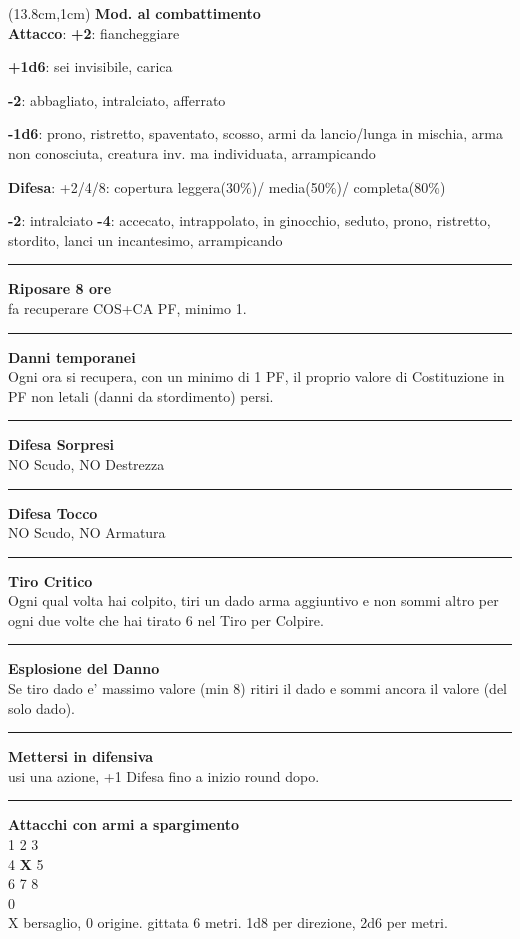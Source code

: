 \documentclass[a4paper,12 pt,openany]{book}
\newcommand{\riga}{\rule{\textwidth}{0.4pt}}
\begin{document}
\begin{textblock*}{6.2cm}(13.8cm,1cm) %
\textbf{Mod. al combattimento}\\
\textbf{Attacco}:
\textbf{+2}: fiancheggiare

\textbf{+1d6}: sei invisibile, carica

\textbf{-2}: abbagliato, intralciato, afferrato

\textbf{-1d6}: prono, ristretto, spaventato, scosso, armi da lancio/lunga in mischia, arma non conosciuta, creatura inv. ma individuata, arrampicando

\textbf{Difesa}: +2/4/8: copertura leggera(30\%)/ media(50\%)/ completa(80\%)

\textbf{-2}: intralciato \textbf{-4}: accecato, intrappolato, in ginocchio, seduto, prono, ristretto, stordito, lanci un incantesimo, arrampicando
\riga

\textbf{Riposare 8 ore} \\fa recuperare COS+CA PF, minimo 1.

\riga

\textbf{Danni temporanei}\\ Ogni ora si recupera, con un minimo di 1 PF, il proprio valore di Costituzione in PF non letali (danni da stordimento) persi.

\riga

\textbf{Difesa Sorpresi}\\NO Scudo, NO Destrezza

\riga

\textbf{Difesa Tocco}\\ NO Scudo, NO Armatura

\riga

\textbf{Tiro Critico}\\
Ogni qual volta hai colpito, tiri un dado arma aggiuntivo e non sommi altro per ogni due volte che hai tirato 6 nel Tiro per Colpire.

\riga

\textbf{Esplosione del Danno}\\
Se tiro dado e' massimo valore (min 8) ritiri il dado e sommi ancora il valore (del solo dado).

\riga

\textbf{Mettersi in difensiva}\\
usi una azione, +1 Difesa fino a inizio round dopo.


\riga

\textbf{Attacchi con armi a spargimento}\\
		1 2 3\\
		4 \textbf{X} 5\\
		6 7 8\\
		0\\
		X bersaglio, 0 origine. gittata 6 metri. 1d8 per direzione, 2d6 per metri.


\end{textblock*}
\end{document}
